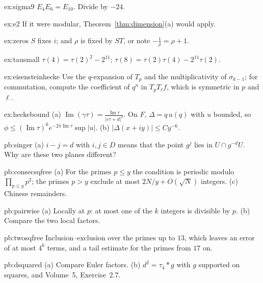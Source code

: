 \begin{hint}{ex:sigma9}
$E_4E_6=E_{10}$. Divide by $-24$.
\end{hint}
\begin{hint}{ex:e2}
If it were modular, Theorem~\ref{thm:dimension}(a) would apply.
\end{hint}
\begin{hint}{ex:zeros}
$S$ fixes $i$; and $\rho$ is fixed by $ST$, or note $-\frac1\rho=\rho+1$.
\end{hint}
\begin{hint}{ex:tausmall}
$\tau(4)=\tau(2)^2-2^{11}$; $\tau(8)=\tau(2)\tau(4)-2^{11}\tau(2)$.
\end{hint}
\begin{hint}{ex:eisensteinhecke}
Use the $q$-expansion of $T_p$ and the multiplicativity of $\sigma_{k-1}$; for commutation, compute the coefficient of $q^n$ in $T_pT_\ell f$, which is symmetric in $p$ and $\ell$.
\end{hint}
\begin{hint}{ex:heckebound}
(a) $\operatorname{Im}(\gamma\tau)=\frac{\operatorname{Im}\tau}{|c\tau+d|^2}$. On $F$, $\Delta=q\,u(q)$ with $u$ bounded, so $\phi\le(\operatorname{Im}\tau)^6e^{-2\pi\operatorname{Im}\tau}\sup|u|$. (b) $|\Delta(x+iy)|\le Cy^{-6}$.
\end{hint}

\begin{hint}{pb:singer}
(a) $i-j=d$ with $i,j\in D$ means that the point $g^j$ lies in $U\cap g^{-d}U$. Why are these two planes different?
\end{hint}

\begin{hint}{pb:consecsqfree}
(a) For the primes $p\le y$ the condition is periodic modulo $\prod_{p\le y}p^2$; the primes $p>y$ exclude at most $2N/y+O(\sqrt N)$
integers. (c) Chinese remainders.
\end{hint}

\begin{hint}{pb:pairwise}
(a) Locally at $p$: at most one of the $k$ integers is divisible by $p$. (b) Compare the two local factors.
\end{hint}

\begin{hint}{pb:twosqfree}
Inclusion--exclusion over the primes up to $13$, which leaves an error of at most $4^6$ terms, and a tail estimate for the
primes from $17$ on.
\end{hint}

\begin{hint}{pb:dsquared}
(a) Compare Euler factors. (b) $d^2=\tau_4*g$ with $g$ supported on squares, and Volume~5, Exercise~2.7.
\end{hint}

